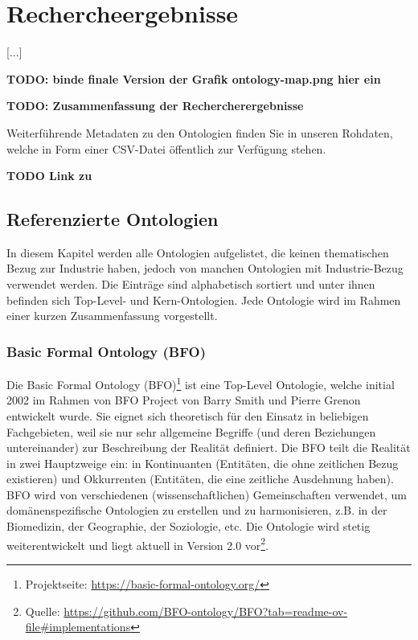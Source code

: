 \documentclass{article}
\begin{document}
\section{Rechercheergebnisse}

[...]

\textbf{TODO: binde finale Version der Grafik ontology-map.png hier ein}

\textbf{TODO: Zusammenfassung der Rechercherergebnisse}

Weiterführende Metadaten zu den Ontologien finden Sie in unseren Rohdaten, welche in Form einer CSV-Datei öffentlich zur Verfügung stehen.

\textbf{TODO Link zu }

\subsection{Referenzierte Ontologien}

In diesem Kapitel werden alle Ontologien aufgelistet, die keinen thematischen Bezug zur Industrie haben, jedoch von manchen Ontologien mit Industrie-Bezug verwendet werden.
Die Einträge sind alphabetisch sortiert und unter ihnen befinden sich Top-Level- und Kern-Ontologien.
Jede Ontologie wird im Rahmen einer kurzen Zusammenfassung vorgestellt.

\subsubsection{Basic Formal Ontology (BFO)}

Die Basic Formal Ontology (BFO)\footnote{Projektseite: \url{https://basic-formal-ontology.org/}} ist eine Top-Level Ontologie, welche initial 2002 im Rahmen von BFO Project von Barry Smith und Pierre Grenon entwickelt wurde.
Sie eignet sich theoretisch für den Einsatz in beliebigen Fachgebieten, weil sie nur sehr allgemeine Begriffe (und deren Beziehungen untereinander) zur Beschreibung der Realität definiert.
Die BFO teilt die Realität in zwei Hauptzweige ein: in Kontinuanten (Entitäten, die ohne zeitlichen Bezug existieren) und Okkurrenten (Entitäten, die eine zeitliche Ausdehnung haben).
BFO wird von verschiedenen (wissenschaftlichen) Gemeinschaften verwendet, um domänenspezifische Ontologien zu erstellen und zu harmonisieren, z.B. in der Biomedizin, der Geographie, der Soziologie, etc.
Die Ontologie wird stetig weiterentwickelt und liegt aktuell in Version 2.0 vor\footnote{Quelle: \url{https://github.com/BFO-ontology/BFO?tab=readme-ov-file\#implementations}}.
\end{document}
